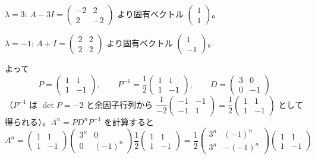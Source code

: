\documentclass[a4paper,11pt]{article}
\begin{document}
$\lambda = 3$: $A - 3I = \begin{pmatrix} -2 & 2 \\ 2 & -2 \end{pmatrix}$ より固有ベクトル $\begin{pmatrix}1\\1\end{pmatrix}$。

$\lambda = -1$: $A + I = \begin{pmatrix} 2 & 2 \\ 2 & 2 \end{pmatrix}$ より固有ベクトル $\begin{pmatrix}1\\-1\end{pmatrix}$。

よって
\[
P = \begin{pmatrix} 1 & 1 \\ 1 & -1 \end{pmatrix}, \qquad
P^{-1} = \frac{1}{2}\begin{pmatrix} 1 & 1 \\ 1 & -1 \end{pmatrix}, \qquad
D = \begin{pmatrix} 3 & 0 \\ 0 & -1 \end{pmatrix}
\]
（$P^{-1}$ は $\det P = -2$ と余因子行列から $\dfrac{1}{-2}\begin{pmatrix}-1 & -1\\-1 & 1\end{pmatrix} = \dfrac12\begin{pmatrix}1&1\\1&-1\end{pmatrix}$ として得られる）。$A^{n} = PD^{n}P^{-1}$ を計算すると
\[
A^{n} = \begin{pmatrix} 1 & 1 \\ 1 & -1 \end{pmatrix}
\begin{pmatrix} 3^{n} & 0 \\ 0 & (-1)^{n} \end{pmatrix}
\frac{1}{2}\begin{pmatrix} 1 & 1 \\ 1 & -1 \end{pmatrix}
= \frac{1}{2}\begin{pmatrix} 3^{n} & (-1)^{n} \\ 3^{n} & -(-1)^{n} \end{pmatrix}
\begin{pmatrix} 1 & 1 \\ 1 & -1 \end{pmatrix}
\]
\end{document}

